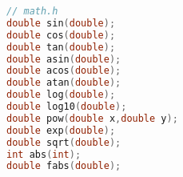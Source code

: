 \begin{frame}[fragile]
  \begin{lstlisting}[language=c,backgroundcolor=\color{red!10}]
// math.h
double sin(double);   
double cos(double);   
double tan(double);   
double asin(double);  
double acos(double); 
double atan(double); 
double log(double);  
double log10(double); 
double pow(double x,double y); 
double exp(double); 
double sqrt(double); 
int abs(int);  
double fabs(double); 
\end{lstlisting}
\end{frame}
